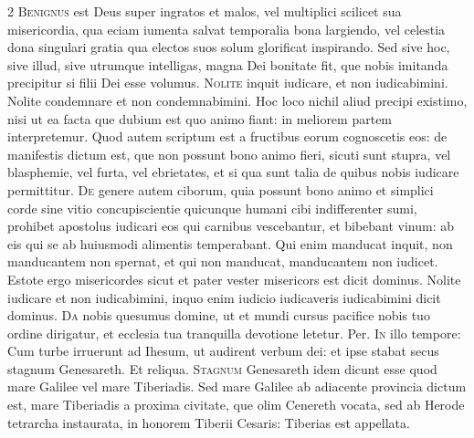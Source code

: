 \begin{multicols*}{2}
\lettrine[lines=2]{\zallmancaps \color{Blue} B}{enignus} est Deus super ingratos et malos, vel multiplici scilicet sua misericordia, qua eciam iumenta salvat temporalia bona largiendo, vel celestia dona singulari gratia qua electos suos solum glorificat inspirando. Sed sive hoc, sive illud, sive utrumque intelligas, magna Dei bonitate fit, que nobis imitanda precipitur si filii Dei esse volumus.
\lettrine[lines=2]{\zallmancaps \color{Red} N}{olite} inquit iudicare, et non iudicabimini. Nolite condemnare et non condemnabimini. Hoc loco nichil aliud precipi existimo, nisi ut ea facta que dubium est quo animo fiant: in meliorem partem interpretemur. Quod autem scriptum est a fructibus eorum cognoscetis eos: de manifestis dictum est, que non possunt bono animo fieri, sicuti sunt stupra, vel blasphemie, vel furta, vel ebrietates, et si qua sunt talia de quibus nobis iudicare permittitur.
\lettrine[lines=2]{\zallmancaps \color{Blue} D}{e} genere autem ciborum, quia possunt bono animo et simplici corde sine vitio concupiscientie quicunque humani cibi indifferenter sumi, prohibet apostolus iudicari eos qui carnibus vescebantur, et bibebant vinum: ab eis qui se ab huiusmodi alimentis temperabant. Qui enim manducat inquit, non manducantem non spernat, et qui non manducat, manducantem non iudicet.
 Estote ergo misericordes sicut et pater vester misericors est dicit dominus.
 Nolite iudicare et non iudicabimini, inquo enim iudicio iudicaveris iudicabimini dicit dominus.
\lettrine[lines=2]{\zallmancaps \color{Red} D}{a} nobis quesumus domine, ut et mundi cursus pacifice nobis tuo ordine dirigatur, et ecclesia tua tranquilla devotione letetur. Per.
\lettrine[lines=2]{\zallmancaps \color{Blue} I}{n} illo tempore: Cum turbe irruerunt ad Ihesum, ut audirent verbum dei: et ipse stabat secus stagnum Genesareth. Et reliqua.
\lettrine[lines=2]{\zallmancaps \color{Red} S}{tagnum} Genesareth idem dicunt esse quod mare Galilee vel mare Tiberiadis. Sed mare Galilee ab adiacente provincia dictum est, mare Tiberiadis a proxima civitate, que olim Cenereth vocata, sed ab Herode tetrarcha instaurata, in honorem Tiberii Cesaris: Tiberias est appellata.

\end{multicols*}
